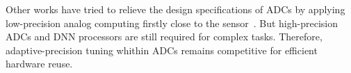 Other works have tried to relieve the design specifications of ADCs by applying low-precision analog computing firstly close to the sensor~\cite{chen_asp_2016,liu_ns-cim_2020}. 
But high-precision ADCs and DNN processors are still required for complex tasks. Therefore, adaptive-precision tuning whithin ADCs remains competitive for efficient hardware reuse.
 
